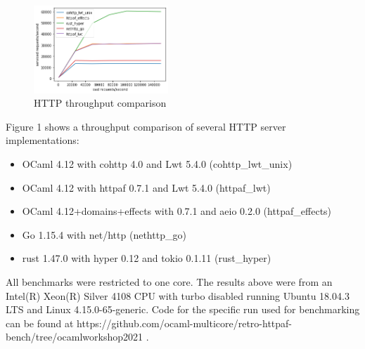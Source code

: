 \documentclass[a4paper,twocolumn]{article}
\begin{document}
\begin{figure}[hbtp]
\caption{HTTP throughput comparison}
\centering
\includegraphics[width=0.45\textwidth]{rps-graph.png}
\end{figure}

Figure 1 shows a throughput comparison of several HTTP server implementations:
\begin{itemize}
\item OCaml 4.12 with cohttp 4.0 and Lwt 5.4.0 (cohttp\_lwt\_unix)
\item OCaml 4.12 with httpaf 0.7.1 and Lwt 5.4.0 (httpaf\_lwt)
\item OCaml 4.12+domains+effects with 0.7.1 and aeio 0.2.0 (httpaf\_effects)
\item Go 1.15.4 with net/http (nethttp\_go)
\item rust 1.47.0 with hyper 0.12 and tokio 0.1.11 (rust\_hyper)
\end{itemize}

All benchmarks were restricted to one core. The results above were from an Intel(R) Xeon(R) Silver 4108 CPU with turbo disabled running Ubuntu 18.04.3 LTS and Linux 4.15.0-65-generic. Code for the specific run used for benchmarking can be found at https://github.com/ocaml-multicore/retro-httpaf-bench/tree/ocamlworkshop2021 .
\end{document}
